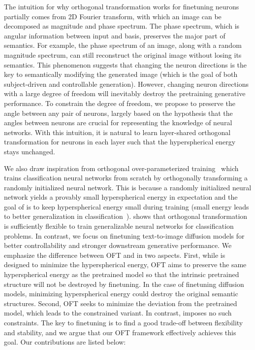 The intuition for why orthogonal transformation works for finetuning neurons partially comes from 2D Fourier transform, with which an image can be decomposed as magnitude and phase spectrum. The phase spectrum, which is angular information between input and basis, preserves the major part of semantics. For example, the phase spectrum of an image, along with a random magnitude spectrum, can still reconstruct the original image without losing its semantics. This phenomenon suggests that changing the neuron directions is the key to semantically modifying the generated image (which is the goal of both subject-driven and controllable generation). However, changing neuron directions with a large degree of freedom will inevitably destroy the pretraining generative performance. To constrain the degree of freedom, we propose to preserve the angle between any pair of neurons, largely based on the hypothesis that the angles between neurons are crucial for representing the knowledge of neural networks. With this intuition, it is natural to learn layer-shared orthogonal transformation for neurons in each layer such that the hyperspherical energy stays unchanged.

We also draw inspiration from orthogonal over-parameterized training~\cite{liu2021orthogonal} which trains classification neural networks from scratch by orthogonally transforming a randomly initialized neural network. This is because a randomly initialized neural network yields a provably small hyperspherical energy in expectation and the goal of \cite{liu2021orthogonal} is to keep hyperspherical energy small during training (small energy leads to better generalization in classification~\cite{liu2018learning,lin2020regularizing}). \cite{liu2021orthogonal} shows that orthogonal transformation is sufficiently flexible to train generalizable neural networks for classification problems. In contrast, we focus on finetuning text-to-image diffusion models for better controllability and stronger downstream generative performance. 
We emphasize the difference between OFT and \cite{liu2021orthogonal} in two aspects. First, while \cite{liu2021orthogonal} is designed to minimize the hyperspherical energy, OFT aims to preserve the same hyperspherical energy as the pretrained model so that the intrinsic pretrained structure will not be destroyed by finetuning. In the case of finetuning diffusion models, minimizing hyperspherical energy could destroy the original semantic structures. Second, OFT seeks to minimize the deviation from the pretrained model, which leads to the constrained variant. In contrast, \cite{liu2021orthogonal} imposes no such constraints. The key to finetuning is to find a good trade-off between flexibility and stability, and we argue that our OFT framework effectively achieves this goal. Our contributions are listed below:

